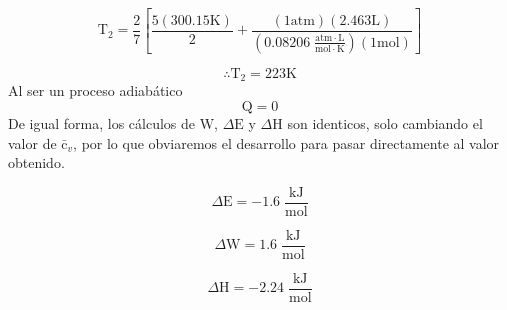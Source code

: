 \documentclass[12pt]{article}
\begin{document}
\begin{displaymath}
	\mathrm{T}_2=\frac{2}{7}\left[ \frac{5(300.15\mathrm{K})}{2} +\frac{(1\mathrm{atm})(2.463\mathrm{L})}{(0.08206\; \frac{\mathrm{atm}\cdot\mathrm{L}}{\mathrm{mol}\cdot\mathrm{K}})(1\mathrm{mol})} \right]
\end{displaymath}

\begin{displaymath}
	\therefore \mathrm{T}_2=223\mathrm{K}
\end{displaymath}
Al ser un proceso adiabático 
\begin{displaymath}
	\mathrm{Q}=0
\end{displaymath}
De igual forma, los cálculos de $\mathrm{W}$, $\Delta\mathrm{E}$ y $\Delta\mathrm{H}$ son identicos, solo cambiando el valor de $\mathrm{\bar{c}}_v$, por lo que obviaremos el desarrollo para pasar directamente al valor obtenido.

\begin{displaymath}
	\Delta\mathrm{E}=-1.6\; \frac{\mathrm{kJ}}{\mathrm{mol}}
\end{displaymath}

\begin{displaymath}
	\Delta\mathrm{W}=1.6\; \frac{\mathrm{kJ}}{\mathrm{mol}}
\end{displaymath}

\begin{displaymath}
	\Delta\mathrm{H}=-2.24\; \frac{\mathrm{kJ}}{\mathrm{mol}}
\end{displaymath}
\end{document}
